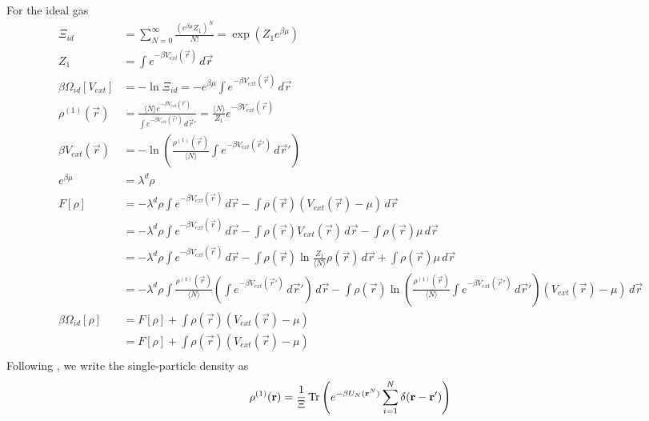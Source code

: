 For the ideal gas
\begin{align*}
  \Xi_{id} &=
  \sum_{N=0}^\infty
  \frac{(e^{\beta\mu} Z_1)^N}{N!}
  = \exp{\left( Z_1 e^{\beta \mu} \right)} \\
  Z_1 &= \int e^{-\beta V_{ext}(\vec{r})} \, d\vec{r} \\
  \beta\Omega_{id}[V_{ext}] &=
  - \ln{\Xi_{id}}
  =
  - e^{\beta\mu} \int e^{-\beta V_{ext}(\vec{r})} \, d\vec{r} \\
  \rho^{(1)}(\vec{r}) &=
  \frac{\langle N \rangle e^{-\beta V_{ext}(\vec{r})}}
       {\int e^{-\beta V_{ext}(\vec{r}')} \, d\vec{r}'} =
  \frac{\langle N \rangle}{Z_1} e^{-\beta V_{ext}(\vec{r})}
  \\
  \beta V_{ext}(\vec{r})
  &=
  -\ln
  \left(
  \frac{\rho^{(1)}(\vec{r})}{\langle N \rangle}
  \int e^{-\beta V_{ext}(\vec{r}')} \, d\vec{r}'
  \right)
  \\
  e^{\beta \mu} &= \lambda^d \rho
  \\
  F[\rho]
  &=
  - \lambda^d \rho
  \int e^{-\beta V_{ext}(\vec{r})} \, d\vec{r} -
  \int
  \rho(\vec{r})
  (V_{ext}(\vec{r}) - \mu)
  \, d\vec{r}
  \\
  &=
  - \lambda^d \rho
  \int e^{-\beta V_{ext}(\vec{r})} \, d\vec{r} -
  \int
  \rho(\vec{r})
  V_{ext}(\vec{r})
  \, d\vec{r} -
  \int
  \rho(\vec{r}) \mu
  \, d\vec{r}
  \\
  &=
  - \lambda^d \rho
  \int e^{-\beta V_{ext}(\vec{r})} \, d\vec{r} -
  \int
  \rho(\vec{r})
  \ln {\frac{Z_1}{\langle N \rangle} \rho(\vec{r})}
  \, d\vec{r} +
  \int
  \rho(\vec{r}) \mu
  \, d\vec{r}
  \\
  &=
  - \lambda^d \rho
  \int
  \frac{\rho^{(1)}(\vec{r})}{\langle N \rangle}
  \left( \int e^{-\beta V_{ext}(\vec{r}')} \, d\vec{r}' \right)
  \, d\vec{r} -
  \int
  \rho(\vec{r})
  \ln{\left(
  \frac{\rho^{(1)}(\vec{r})}{\langle N \rangle}
  \int e^{-\beta V_{ext}(\vec{r}')} \, d\vec{r}'
  \right)}
  (V_{ext}(\vec{r}) - \mu)
  \, d\vec{r}
  \\
  \beta\Omega_{id}[\rho] &=
  F[\rho] + \int \rho(\vec{r}) (V_{ext}(\vec{r}) - \mu) \\
  &=
  F[\rho] + \int \rho(\vec{r}) (V_{ext}(\vec{r}) - \mu) \\
\end{align*}
Following \cite{Ashcroft1996}, we write the single-particle density as
\begin{equation*}
  \rho^{(1)}(\boldsymbol{\mathbf{r}}) =
  \frac{1}{\Xi}
  \operatorname*{Tr}{ \left(
    e^{-\beta U_N(\boldsymbol{\mathbf{r}}^N)} \sum_{i=1}^N \delta(\boldsymbol{\mathbf{r}} - \boldsymbol{\mathbf{r}}')
    \right)
  }
\end{equation*}
